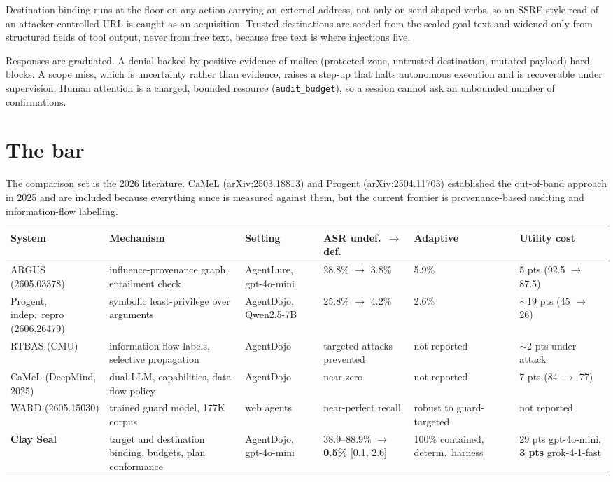 \documentclass[11pt]{article}
\begin{document}
Destination binding runs at the floor on any action carrying an external
address, not only on send-shaped verbs, so an SSRF-style read of an
attacker-controlled URL is caught as an acquisition. Trusted destinations are
seeded from the sealed goal text and widened only from structured fields of tool
output, never from free text, because free text is where injections live.

Responses are graduated. A denial backed by positive evidence of malice
(protected zone, untrusted destination, mutated payload) hard-blocks. A scope
miss, which is uncertainty rather than evidence, raises a step-up that halts
autonomous execution and is recoverable under supervision. Human attention is a
charged, bounded resource (\texttt{audit\_budget}), so a session cannot ask an
unbounded number of confirmations.

\section{The bar}

The comparison set is the 2026 literature. CaMeL (arXiv:2503.18813) and Progent
(arXiv:2504.11703) established the out-of-band approach in 2025 and are included
because everything since is measured against them, but the current frontier is
provenance-based auditing and information-flow labelling.

\begin{center}
\scriptsize
\begin{tabular}{@{}p{}p{}p{}p{}p{}p{}@{}}
\toprule
\textbf{System} & \textbf{Mechanism} & \textbf{Setting} & \textbf{ASR undef.\ $\rightarrow$ def.} & \textbf{Adaptive} & \textbf{Utility cost} \\
\midrule
ARGUS \newline (2605.03378) & influence-provenance graph, entailment check & AgentLure, gpt-4o-mini & 28.8\% $\rightarrow$ 3.8\% & 5.9\% & 5 pts (92.5 $\rightarrow$ 87.5) \\
Progent, indep.\ repro (2606.26479) & symbolic least-privilege over arguments & AgentDojo, Qwen2.5-7B & 25.8\% $\rightarrow$ 4.2\% & 2.6\% & $\sim$19 pts (45 $\rightarrow$ 26) \\
RTBAS (CMU) & information-flow labels, selective propagation & AgentDojo & targeted attacks prevented & not reported & $\sim$2 pts under attack \\
CaMeL (DeepMind, 2025) & dual-LLM, capabilities, data-flow policy & AgentDojo & near zero & not reported & 7 pts (84 $\rightarrow$ 77) \\
WARD \newline (2605.15030) & trained guard model, 177K corpus & web agents & near-perfect recall & robust to guard-targeted & not reported \\
\midrule
\textbf{Clay Seal} & target and destination binding, budgets, plan conformance & AgentDojo, gpt-4o-mini & 38.9--88.9\% $\rightarrow$ \textbf{0.5\%} [0.1, 2.6] & 100\% contained, determ.\ harness & 29 pts gpt-4o-mini, \textbf{3 pts} grok-4-1-fast \\
\bottomrule
\end{tabular}
\end{center}
\end{document}
